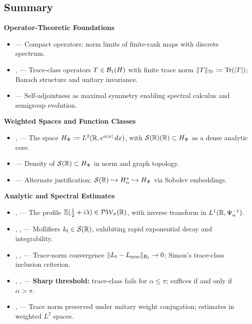 \subsection*{Summary}
\label{sec:foundations_summary}

\textbf{Operator-Theoretic Foundations}
\begin{itemize}
  \item {} — Compact operators: norm limits of finite-rank maps with discrete spectrum.
  \item {},  — Trace-class operators \( T \in \mathcal{B}_1(H) \) with finite trace norm \( \|T\|_{\operatorname{Tr}} := \operatorname{Tr}(|T|) \); Banach structure and unitary invariance.
  \item {} — Self-adjointness as maximal symmetry enabling spectral calculus and semigroup evolution.
\end{itemize}

\textbf{Weighted Spaces and Function Classes}
\begin{itemize}
  \item {},  — The space \( H_{\Psi} := L^2(\mathbb{R}, e^{\alpha|x|}\,dx) \), with \( \mathcal{S}(\mathbb{R})(\mathbb{R}) \subset H_{\Psi} \) as a dense analytic core.
  \item {} — Density of \( \mathcal{S}(\mathbb{R}) \subset H_{\Psi} \) in norm and graph topology.
  \item {} — Alternate justification: \( \mathcal{S}(\mathbb{R}) \hookrightarrow H^s_\alpha \hookrightarrow H_{\Psi} \) via Sobolev embeddings.
\end{itemize}

\textbf{Analytic and Spectral Estimates}
\begin{itemize}
  \item {},  — The profile \( \Xi(\tfrac{1}{2} + i\lambda) \in \mathcal{PW}_{\pi}(\mathbb{R}) \), with inverse transform in \( L^1(\mathbb{R}, \Psi_\alpha^{-1}) \).
  \item {}, ,  — Mollifiers \( k_t \in \mathcal{S}(\mathbb{R}) \), exhibiting rapid exponential decay and integrability.
  \item {}, ,  — Trace-norm convergence \( \|L_t - L_{\mathrm{sym}}\|_{\mathcal{B}_1} \to 0 \); Simon’s trace-class inclusion criterion.
  \item {}, ,  — \textbf{Sharp threshold:} trace-class fails for \( \alpha \le \pi \); suffices if and only if \( \alpha > \pi \).
  \item {},  — Trace norm preserved under unitary weight conjugation; estimates in weighted \( L^2 \) spaces.
\end{itemize}

